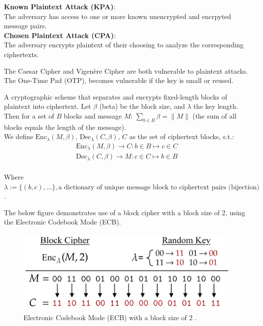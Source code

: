 \begin{Def}

    \textbf{Known Plaintext Attack (KPA)}:\\
    The adversary has access to one or more known unencrypted and encrpyted message pairs.\\

    \vspace{-.5em}
    \noindent
    \textbf{Chosen Plaintext Attack (CPA)}:\\
    The adversary encrypts plaintext of their choosing to analyze the corresponding ciphertexts.
\end{Def}

\noindent
The Caesar Cipher and Vigenère Cipher are both vulnerable to plaintext attacks. The One-Time Pad (OTP), becomes vulnerable if the key is small or reused.


\begin{Def}

    \label{theo:block_cipher}
    A cryptographic scheme that separates and encrypts fixed-length blocks of plaintext into ciphertext. Let $\beta$ (beta) be the block size, and $\lambda$ the key length.
    Then for a set of $B$ blocks and message $M$: $\sum_{b\in B} \beta = \|M\|$ (the sum of all blocks equals the length of the message).\\
    We define $\text{Enc}_\lambda(M,\beta)$, $\text{Dec}_\lambda(C,\beta)$, $C$ as the set of ciphertext blocks, s.t.:
    \begin{align*}
        \text{Enc}_\lambda(M,\beta) \rightarrow C : b\in B \mapsto c\in C\\
        \text{Dec}_\lambda(C,\beta) \rightarrow M : c\in C \mapsto b\in B\\
    \end{align*} 

    \vspace{-1em}
    \noindent
    Where $\lambda :=\{(b,c),\dots\}, \text{a dictionary of unique message block to ciphertext pairs (bijection)}$.
\end{Def}

\newpage 

\noindent
The below figure demonstrates use of a block cipher with a block size of 2, using the Electronic Codebook Mode (ECB).
\begin{figure}[h!]
    \centering
    \includegraphics[width=.8\textwidth]{Sections/sec/enc/block.png}
    \caption{Electronic Codebook Mode (ECB) with a block size of 2 \cite{essex2024encrypting}.}
    \label{fig:block_cipher}
\end{figure}

